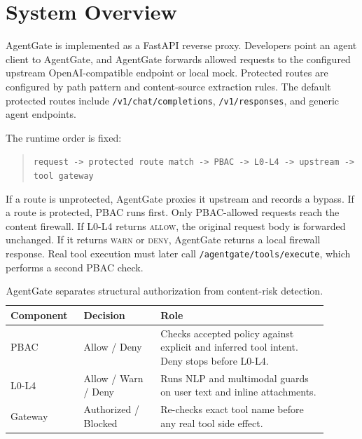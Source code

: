 \documentclass[11pt]{article}
\begin{document}
\section{System Overview}

AgentGate is implemented as a FastAPI reverse proxy. Developers point an agent client to AgentGate, and AgentGate forwards allowed requests to the configured upstream OpenAI-compatible endpoint or local mock. Protected routes are configured by path pattern and content-source extraction rules. The default protected routes include \texttt{/v1/chat/completions}, \texttt{/v1/responses}, and generic agent endpoints.

The runtime order is fixed:

\begin{quote}
\small
\texttt{request -> protected route match -> PBAC -> L0-L4 -> upstream -> tool gateway}
\end{quote}

If a route is unprotected, AgentGate proxies it upstream and records a bypass. If a route is protected, PBAC runs first. Only PBAC-allowed requests reach the content firewall. If L0-L4 returns \textsc{allow}, the original request body is forwarded unchanged. If it returns \textsc{warn} or \textsc{deny}, AgentGate returns a local firewall response. Real tool execution must later call \texttt{/agentgate/tools/execute}, which performs a second PBAC check.

\begin{table}[t]
\small
\centering
\setlength{\tabcolsep}{3pt}
\begin{tabular}{>{\raggedright\arraybackslash}p{0.20\linewidth}
                >{\raggedright\arraybackslash}p{0.22\linewidth}
                >{\raggedright\arraybackslash}p{0.48\linewidth}}
\toprule
\textbf{Component} & \textbf{Decision} & \textbf{Role} \\
\midrule
PBAC & Allow / Deny & Checks accepted policy against explicit and inferred tool intent. Deny stops before L0-L4. \\
L0-L4 & Allow / Warn / Deny & Runs NLP and multimodal guards on user text and inline attachments. \\
Gateway & Authorized / Blocked & Re-checks exact tool name before any real tool side effect. \\
\bottomrule
\end{tabular}
\caption{AgentGate separates structural authorization from content-risk detection.}
\label{tab:flow}
\end{table}
\end{document}
